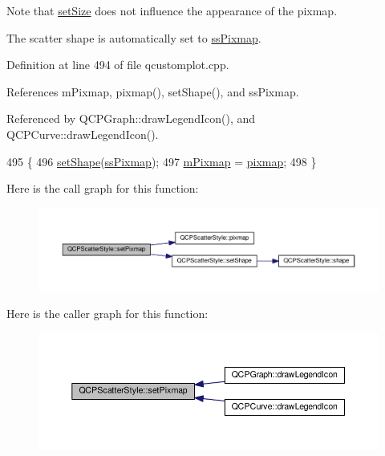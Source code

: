 Note that \hyperlink{class_q_c_p_scatter_style_aaefdd031052892c4136129db68596e0f}{set\+Size} does not influence the appearance of the pixmap.

The scatter shape is automatically set to \hyperlink{class_q_c_p_scatter_style_adb31525af6b680e6f1b7472e43859349a8718b849ca7c307b07b8e091efb0c31e}{ss\+Pixmap}. 

Definition at line 494 of file qcustomplot.\+cpp.



References m\+Pixmap, pixmap(), set\+Shape(), and ss\+Pixmap.



Referenced by Q\+C\+P\+Graph\+::draw\+Legend\+Icon(), and Q\+C\+P\+Curve\+::draw\+Legend\+Icon().


\begin{DoxyCode}
495 \{
496   \hyperlink{class_q_c_p_scatter_style_a7c641c4d4c6d29cb705d3887cfce91c1}{setShape}(\hyperlink{class_q_c_p_scatter_style_adb31525af6b680e6f1b7472e43859349a8718b849ca7c307b07b8e091efb0c31e}{ssPixmap});
497   \hyperlink{class_q_c_p_scatter_style_a7697346c89b19d4cd1d8dd33319ec9e3}{mPixmap} = \hyperlink{class_q_c_p_scatter_style_a9bab44cc41fcd585621a4b3e0e48231b}{pixmap};
498 \}
\end{DoxyCode}


Here is the call graph for this function\+:\nopagebreak
\begin{figure}[H]
\begin{center}
\leavevmode
\includegraphics[width=350pt]{class_q_c_p_scatter_style_a5fb611d46acfac520d7b89a1c71d9246_cgraph}
\end{center}
\end{figure}




Here is the caller graph for this function\+:\nopagebreak
\begin{figure}[H]
\begin{center}
\leavevmode
\includegraphics[width=350pt]{class_q_c_p_scatter_style_a5fb611d46acfac520d7b89a1c71d9246_icgraph}
\end{center}
\end{figure}


